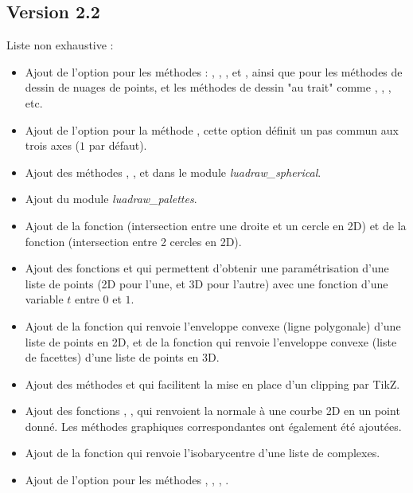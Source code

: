 \subsection{Version 2.2}
Liste non exhaustive :
\begin{itemize}
    \item Ajout de l'option  pour les méthodes : , , ,  et , ainsi que pour les méthodes de dessin de nuages de points, et les méthodes de dessin "au trait" comme , , , etc.
    \item Ajout de l'option  pour la méthode , cette option définit un pas commun aux trois axes ($1$ par défaut).
    \item Ajout des méthodes , ,  et  dans le module \emph{luadraw\_spherical}.
    \item Ajout du module \emph{luadraw\_palettes}.
    \item Ajout de la fonction  (intersection entre une droite et un cercle en 2D) et de la fonction  (intersection entre 2 cercles en 2D).
    \item Ajout des fonctions  et  qui permettent d'obtenir une paramétrisation d'une liste de points (2D pour l'une, et 3D pour l'autre) avec une fonction d'une variable $t$ entre $0$ et $1$.
    \item Ajout de la fonction  qui renvoie l'enveloppe convexe (ligne polygonale) d'une liste de points en 2D, et de la fonction  qui renvoie l'enveloppe convexe (liste de facettes) d'une liste de points en 3D.
    \item Ajout des méthodes  et  qui facilitent la mise en place d'un clipping par TikZ.
    \item Ajout des fonctions , ,  qui renvoient la normale à une courbe 2D en un point donné. Les méthodes graphiques correspondantes ont également été ajoutées.
    \item Ajout de la fonction  qui renvoie l'isobarycentre d'une liste de complexes.
    \item Ajout de l'option  pour les méthodes , , , .

\end{itemize}
